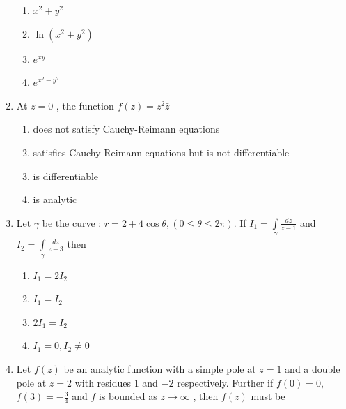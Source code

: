 \documentclass[journal,12pt,twocolumn]{IEEEtran}
\begin{document}
\begin{enumerate}[1.]
\begin{enumerate}

\item $
x^2+y^2
$

\item $
\ln (x^2+y^2)
$

\item $
e^{xy}
$

\item $
e^{x^2-y^2}
$

\end{enumerate}

\item At $z=0$ , the function $f(z)=z^2\bar{z}$


\begin{enumerate}

\item 
does not satisfy Cauchy-Reimann equations

\item 
satisfies Cauchy-Reimann equations but is not differentiable 

\item 
is differentiable

\item 
is analytic

\end{enumerate}

\item Let $\gamma$ be the curve : $ r=2+4 \cos \theta , (0 \leq \theta \leq 2\pi)$. If $ I_{1}=\int\limits_{\gamma} \frac{dz}{z-1}$ and $I_{2}= \int\limits_{\gamma}\frac{dz}{z-3}$ then

\begin{enumerate}

\item $
I_{1}=2I_{2}
$

\item $
I_{1}=I_{2}
$

\item $
2I_{1}=I_{2}
$

\item $
I_{1}=0, I_{2} \neq 0
$

\end{enumerate}

\item Let $f(z)$ be an analytic function with a simple pole at $z=1$ and a double pole at $z=2$ with residues $1$ and $-2$ respectively. Further if $f(0)=0$, $f(3)=-\frac{3}{4}$ and $f$ is bounded as $z\rightarrow \infty $ , then $f(z)$ must be


\end{enumerate}
\end{document}
